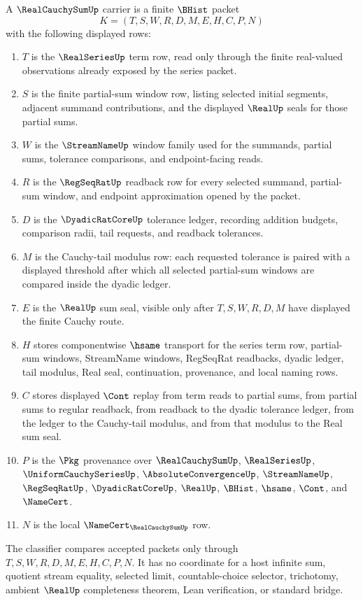 \begin{definition}\label{def:real-cauchy-sum-carrier}
A $\RealCauchySumUp$ carrier is a finite $\BHist$ packet
$$
K=(T,S,W,R,D,M,E,H,C,P,N)
$$
with the following displayed rows:
\begin{enumerate}
\item $T$ is the $\RealSeriesUp$ term row, read only through the finite real-valued observations already exposed by the series packet.
\item $S$ is the finite partial-sum window row, listing selected initial segments, adjacent summand contributions, and the displayed $\RealUp$ seals for those partial sums.
\item $W$ is the $\StreamNameUp$ window family used for the summands, partial sums, tolerance comparisons, and endpoint-facing reads.
\item $R$ is the $\RegSeqRatUp$ readback row for every selected summand, partial-sum window, and endpoint approximation opened by the packet.
\item $D$ is the $\DyadicRatCoreUp$ tolerance ledger, recording addition budgets, comparison radii, tail requests, and readback tolerances.
\item $M$ is the Cauchy-tail modulus row: each requested tolerance is paired with a displayed threshold after which all selected partial-sum windows are compared inside the dyadic ledger.
\item $E$ is the $\RealUp$ sum seal, visible only after $T,S,W,R,D,M$ have displayed the finite Cauchy route.
\item $H$ stores componentwise $\hsame$ transport for the series term row, partial-sum windows, StreamName windows, RegSeqRat readbacks, dyadic ledger, tail modulus, Real seal, continuation, provenance, and local naming rows.
\item $C$ stores displayed $\Cont$ replay from term reads to partial sums, from partial sums to regular readback, from readback to the dyadic tolerance ledger, from the ledger to the Cauchy-tail modulus, and from that modulus to the Real sum seal.
\item $P$ is the $\Pkg$ provenance over $\RealCauchySumUp$, $\RealSeriesUp$, $\UniformCauchySeriesUp$, $\AbsoluteConvergenceUp$, $\StreamNameUp$, $\RegSeqRatUp$, $\DyadicRatCoreUp$, $\RealUp$, $\BHist$, $\hsame$, $\Cont$, and $\NameCert$.
\item $N$ is the local $\NameCert_{\RealCauchySumUp}$ row.
\end{enumerate}
The classifier compares accepted packets only through $T,S,W,R,D,M,E,H,C,P,N$. It has no coordinate for a host infinite sum, quotient stream equality, selected limit, countable-choice selector, trichotomy, ambient $\RealUp$ completeness theorem, Lean verification, or standard bridge.
\end{definition}

